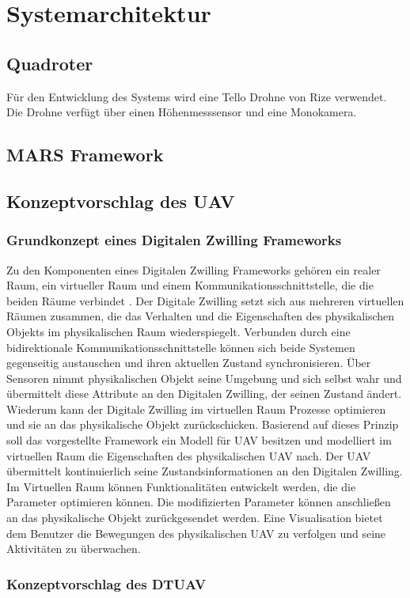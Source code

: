 \section{Systemarchitektur}

\subsection{Quadroter}
Für den Entwicklung des Systems wird eine Tello Drohne von Rize verwendet. Die Drohne verfügt über einen Höhenmesssensor und eine Monokamera. 




\subsection{MARS Framework}

\subsection{Konzeptvorschlag des UAV}

\subsubsection{Grundkonzept eines Digitalen Zwilling Frameworks}

Zu den Komponenten eines Digitalen Zwilling Frameworks gehören ein realer Raum, ein virtueller Raum und einem Kommunikationsschnittstelle, die die beiden Räume verbindet \cite{Gri2016OriOfTheDigTwiCon}. Der Digitale Zwilling setzt sich aus mehreren virtuellen Räumen zusammen, die das Verhalten und die Eigenschaften des physikalischen Objekts im physikalischen Raum wiederspiegelt.
Verbunden durch eine bidirektionale Kommunikationsschnittstelle können sich beide Systemen gegenseitig austauschen und ihren aktuellen Zustand synchronisieren. Über Sensoren nimmt physikalischen Objekt seine Umgebung und sich selbst wahr und übermittelt diese Attribute an den Digitalen Zwilling, der seinen Zustand ändert. Wiederum kann der Digitale Zwilling im virtuellen Raum Prozesse optimieren und sie an das physikalische Objekt zurückschicken.
Basierend auf dieses Prinzip soll das vorgestellte Framework ein Modell für UAV besitzen und modelliert im virtuellen Raum die Eigenschaften des physikalischen UAV nach. Der UAV übermittelt kontinuierlich seine Zustandsinformationen an den Digitalen Zwilling.
Im Virtuellen Raum können Funktionalitäten entwickelt werden, die die Parameter optimieren können. Die modifizierten Parameter können anschließen an das physikalische Objekt zurückgesendet werden. Eine Visualisation bietet dem Benutzer die Bewegungen des physikalischen UAV zu verfolgen und seine Aktivitäten zu überwachen.





\subsubsection{Konzeptvorschlag des DTUAV}

